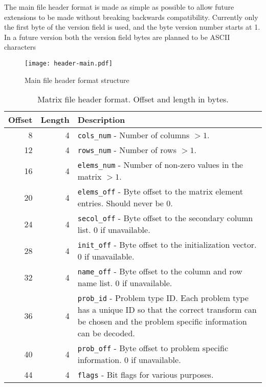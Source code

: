The main file header format is made as simple as possible to allow future extensions to be made without breaking backwards compatibility.
Currently only the first byte of the version field is used, and the byte version number starts at 1.
In a future version both the version field bytes are planned to be ASCII characters 

\begin{figure}[htbp]
	\centering
	\texttt{[image: header-main.pdf]}
	\caption{Main file header format structure}
	\label{fig:header-main}
\end{figure}



\begin{table}[htbp]
	\centering
	\begin{tabular}{|r|r|p{3.2in}|}
		\hline
		\bf Offset & \bf Length & \bf Description \\ \hline
		8  & 4 & \texttt{cols\_num} - Number of columns $> 1$. \\ \hline
		12 & 4 & \texttt{rows\_num} - Number of rows $> 1$. \\ \hline
		16 & 4 & \texttt{elems\_num} - Number of non-zero values in the matrix $> 1$. \\ \hline
		20 & 4 & \texttt{elems\_off} - Byte offset to the matrix element entries. Should never be 0. \\ \hline
		24 & 4 & \texttt{secol\_off} - Byte offset to the secondary column list. 0 if unavailable. \\ \hline
		28 & 4 & \texttt{init\_off} -  Byte offset to the initialization vector. 0 if unavailable. \\ \hline
		32 & 4 & \texttt{name\_off} - Byte offset to the column and row name list. 0 if unavailable. \\ \hline
		36 & 4 & \texttt{prob\_id} - Problem type ID. Each problem type has a unique ID so that the correct transform can be chosen and the problem specific information can be decoded. \\ \hline
		40 & 4 & \texttt{prob\_off} - Byte offset to problem specific information. 0 if unavailable. \\ \hline
		44 & 4 & \texttt{flags} - Bit flags for various purposes. \\ \hline
	\end{tabular}
	\caption{Matrix file header format. Offset and length in bytes.}
	\label{tab:header-matrix}
\end{table}

